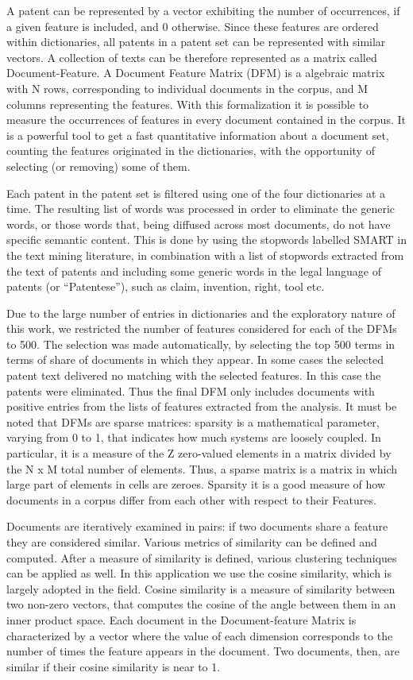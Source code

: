 \documentclass[]{book}
\theoremstyle{definition}
\theoremstyle{definition}
\theoremstyle{definition}
\theoremstyle{remark}
\begin{document}
A patent can be represented by a vector exhibiting the number of
occurrences, if a given feature is included, and 0 otherwise. Since
these features are ordered within dictionaries, all patents in a patent
set can be represented with similar vectors. A collection of texts can
be therefore represented as a matrix called Document-Feature. A Document
Feature Matrix (DFM) is a algebraic matrix with N rows, corresponding to
individual documents in the corpus, and M columns representing the
features. With this formalization it is possible to measure the
occurrences of features in every document contained in the corpus. It is
a powerful tool to get a fast quantitative information about a document
set, counting the features originated in the dictionaries, with the
opportunity of selecting (or removing) some of them.

Each patent in the patent set is filtered using one of the four
dictionaries at a time. The resulting list of words was processed in
order to eliminate the generic words, or those words that, being
diffused across most documents, do not have specific semantic content.
This is done by using the stopwords labelled SMART in the text mining
literature, in combination with a list of stopwords extracted from the
text of patents and including some generic words in the legal language
of patents (or ``Patentese''), such as claim, invention, right, tool
etc.

Due to the large number of entries in dictionaries and the exploratory
nature of this work, we restricted the number of features considered for
each of the DFMs to 500. The selection was made automatically, by
selecting the top 500 terms in terms of share of documents in which they
appear. In some cases the selected patent text delivered no matching
with the selected features. In this case the patents were eliminated.
Thus the final DFM only includes documents with positive entries from
the lists of features extracted from the analysis. It must be noted that
DFMs are sparse matrices: sparsity is a mathematical parameter, varying
from 0 to 1, that indicates how much systems are loosely coupled. In
particular, it is a measure of the Z zero-valued elements in a matrix
divided by the N x M total number of elements. Thus, a sparse matrix is
a matrix in which large part of elements in cells are zeroes. Sparsity
it is a good measure of how documents in a corpus differ from each other
with respect to their Features.

Documents are iteratively examined in pairs: if two documents share a
feature they are considered similar. Various metrics of similarity can
be defined and computed. After a measure of similarity is defined,
various clustering techniques can be applied as well. In this
application we use the cosine similarity, which is largely adopted in
the field. Cosine similarity is a measure of similarity between two
non-zero vectors, that computes the cosine of the angle between them in
an inner product space. Each document in the Document-feature Matrix is
characterized by a vector where the value of each dimension corresponds
to the number of times the feature appears in the document. Two
documents, then, are similar if their cosine similarity is near to 1.
\end{document}
